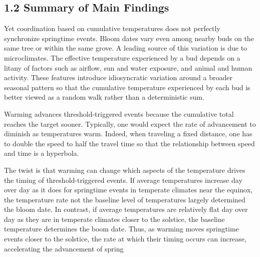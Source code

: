 \subsection{1.2 Summary of Main
Findings}\label{summary-of-main-findings}



Yet coordination based on cumulative temperatures does not perfectly
synchronize springtime events. Bloom dates vary even among nearby buds
on the same tree or within the same grove. A leading source of this
variation is due to microclimates. The effective temperature experienced
by a bud depends on a litany of factors such as airflow, sun and water
exposure, and animal and human activity. These features introduce
idiosyncratic variation around a broader seasonal pattern so that the
cumulative temperature experienced by each bud is better viewed as a
random walk rather than a deterministic sum.


Warming advances threshold-triggered events because the cumulative total
reaches the target sooner. Typically, one would expect the rate of
advancement to diminish as temperatures warm. Indeed, when traveling a
fixed distance, one has to double the speed to half the travel time so
that the relationship between speed and time is a hyperbola.

The twist is that warming can change which aspects of the temperature
drives the timing of threshold-triggered events. If average
temperatures increase day over day as it does for springtime events in
temperate climates near the equinox, the temperature rate not the
baseline level of temperatures largely determined the bloom date. In
contrast, if average temperatures are relatively flat day over day as
they are in temperate climates closer to the solstice, the baseline
temperature determines the boom date. Thus, as warming moves springtime
events closer to the solstice, the rate at which their timing occurs can
increase, accelerating the advancement of spring

